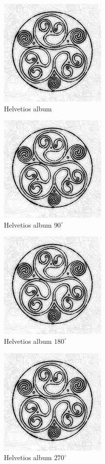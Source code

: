 \documentclass{article}
\begin{document}
\begin{figure}
\centering
\includegraphics[scale=0.5]{helvetios}
\caption{Helvetios album}
\end{figure}

\begin{figure}
\centering
\includegraphics[scale=0.5,angle=90]{helvetios}
\caption{Helvetios album $90^{\circ}$}
\end{figure}

\begin{figure}
	\centering
	\includegraphics[scale=0.5,angle=180]{helvetios}
	\caption{Helvetios album $180^{\circ}$}
\end{figure}

\begin{figure}
	\centering
	\includegraphics[scale=0.5,angle=270]{helvetios}
	\caption*{Helvetios album $270^{\circ}$}
\end{figure}

\clearpage

\listoffigures
\end{document}
